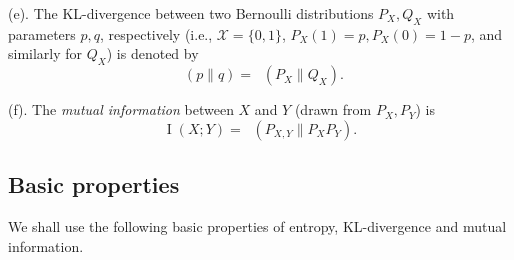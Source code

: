 \documentclass[11pt]{article}
\DeclareMathOperator{\I}{I}
\DeclareMathOperator{\KL}{D_{\text{KL}}}
\begin{document}
\medskip

\noindent (e). The KL-divergence between two Bernoulli distributions $P_X,Q_X$ with parameters $p,q$, respectively (i.e., $\mathcal{X}=\{0,1\}$, $P_X(1)=p,P_X(0)=1-p$, and similarly for $Q_X$) is denoted by $$\KL(p \| q) = \KL( P_X \| Q_X).$$

\medskip 

\noindent (f). The \emph{mutual information} between $X$ and $Y$ (drawn from $P_{X},P_{Y}$) is
$$\I(X;Y) = \KL(P_{X,Y} \| P_X P_Y).$$

\subsection{Basic properties} 

We shall use the following basic properties of entropy, KL-divergence and mutual information.
\end{document}
